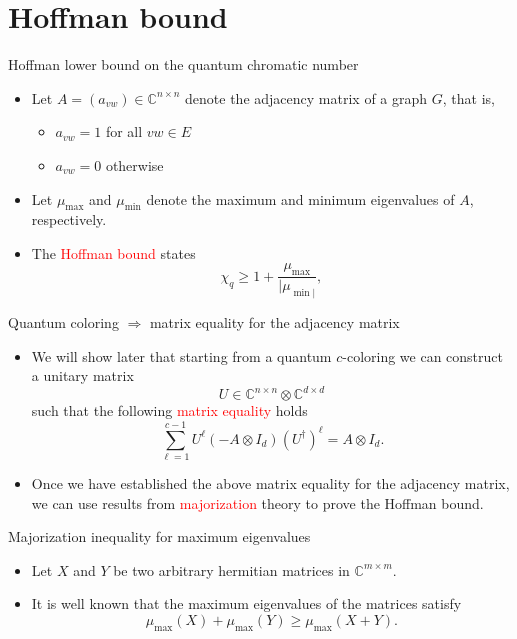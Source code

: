 \documentclass{beamer}
\newcommand{\C}{\mathbb{C}}
\renewcommand{\>}{\rangle}
\newcommand{\<}{\langle}
\begin{document}
%

\section{Hoffman bound}

\begin{frame}{Hoffman lower bound on the quantum chromatic number}

\begin{itemize}
\item Let $A=(a_{vw})\in\C^{n\times n}$ denote the adjacency matrix of a graph $G$, that is, 

\begin{itemize}
\item $a_{vw}=1$ for all $vw\in E$ 
\item $a_{vw}=0$ otherwise
\end{itemize}

\item Let $\mu_{\max}$ and $\mu_{\min}$ denote the maximum and minimum eigenvalues of $A$, respectively.

\item The \textcolor{red}{Hoffman bound} states
\[
\chi_q \ge 1 + \frac{\mu_{\max}}{|\mu_{\min|}},
\]

\end{itemize}
\end{frame}

%

\begin{frame}{Quantum coloring $\Rightarrow$ matrix equality for the adjacency matrix}

\begin{itemize}
\item We will show later that starting from a quantum $c$-coloring we can construct a unitary matrix 
\[
U\in \C^{n\times n}\otimes\C^{d\times d}
\]
such that the following \textcolor{red}{matrix equality} holds
\[
\sum_{\ell=1}^{c-1} U^\ell (-A\otimes I_d) (U^\dagger)^\ell = A \otimes I_d.
\]

\item Once we have established the above matrix equality for the adjacency matrix, we can use results from \textcolor{red}{majorization} theory to prove the Hoffman bound.
\end{itemize}

\end{frame}

%

\begin{frame}{Majorization inequality for maximum eigenvalues}

\begin{itemize}
\item Let $X$ and $Y$ be two arbitrary hermitian matrices in $\C^{m\times m}$.

\item It is well known that the maximum eigenvalues of the matrices satisfy 
\[
\mu_{\max}(X) + \mu_{\max}(Y) \ge \mu_{\max}(X + Y).
\]
\end{itemize}
\end{frame}
\end{document}
